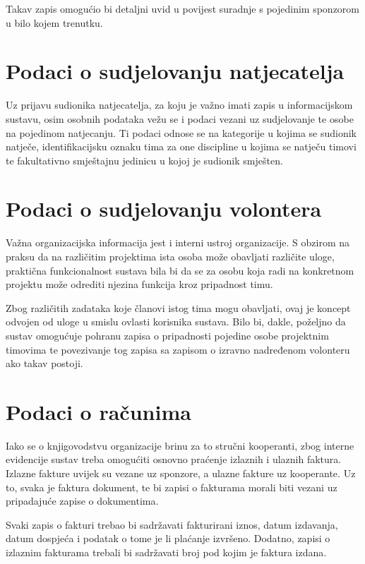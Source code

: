 \documentclass[times, utf8, diplomski]{fer}
\begin{document}
Takav zapis omogućio bi detaljni uvid u povijest suradnje s pojedinim sponzorom
u bilo kojem trenutku.

\section{Podaci o sudjelovanju natjecatelja}

Uz prijavu sudionika natjecatelja, za koju je važno imati zapis u informacijskom
sustavu, osim osobnih podataka vežu se i podaci vezani uz sudjelovanje te osobe
na pojedinom natjecanju. Ti podaci odnose se na kategorije u kojima se sudionik
natječe, identifikacijsku oznaku tima za one discipline u kojima se natječu
timovi te fakultativno smještajnu jedinicu u kojoj je sudionik smješten.

\section{Podaci o sudjelovanju volontera}

Važna organizacijska informacija jest i interni ustroj organizacije. S obzirom
na praksu da na različitim projektima ista osoba može obavljati različite uloge,
praktična funkcionalnost sustava bila bi da se za osobu koja radi na konkretnom
projektu može odrediti njezina funkcija kroz pripadnost timu.

Zbog različitih zadataka koje članovi istog tima mogu obavljati, ovaj je koncept
odvojen od uloge u smislu ovlasti korisnika sustava. Bilo bi, dakle, poželjno da
sustav omogućuje pohranu zapisa o pripadnosti pojedine osobe projektnim timovima
te povezivanje tog zapisa sa zapisom o izravno nadređenom volonteru ako takav
postoji.

\section{Podaci o računima}

Iako se o knjigovodstvu organizacije brinu za to stručni kooperanti, zbog
interne evidencije sustav treba omogućiti osnovno praćenje izlaznih i ulaznih
faktura. Izlazne fakture uvijek su vezane uz sponzore, a ulazne fakture uz
kooperante. Uz to, svaka je faktura dokument, te bi zapisi o fakturama morali
biti vezani uz pripadajuće zapise o dokumentima.

Svaki zapis o fakturi trebao bi sadržavati fakturirani iznos, datum izdavanja,
datum dospjeća i podatak o tome je li plaćanje izvršeno. Dodatno, zapisi o
izlaznim fakturama trebali bi sadržavati broj pod kojim je faktura izdana.
\end{document}
